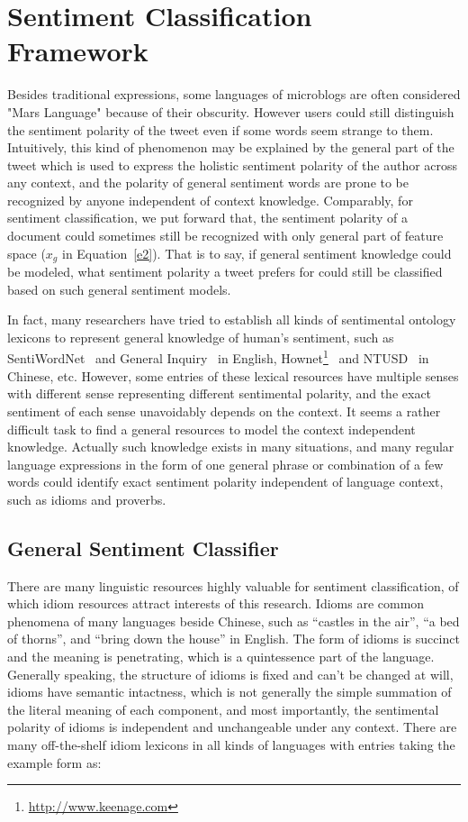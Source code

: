 \documentclass{llncs}
\begin{document}
\section{Sentiment Classification Framework}
\label{framework}
Besides traditional expressions, some languages of microblogs are often considered "Mars Language" because of their obscurity.  
However users could still distinguish the sentiment polarity of the tweet even if some words seem strange to them.
Intuitively, this kind of phenomenon may be explained by the general part of the tweet which is used to express the holistic sentiment polarity of the author across any context, and the polarity of general sentiment words are prone to be recognized by anyone independent of context knowledge. 
Comparably, for sentiment classification, we put forward that, the sentiment polarity of a document could sometimes still be recognized with only general part of feature space ($ x_{g} $ in Equation~\ref{e2}). 
That is to say, if general sentiment knowledge could be modeled, what sentiment polarity a tweet prefers for could still be classified based on such general sentiment models. 

In fact, many researchers have tried to establish all kinds of sentimental ontology lexicons to represent general knowledge of human’s sentiment, such as SentiWordNet~\cite{xsongx:b17} and General Inquiry~\cite{xsongx:b18} in English, Hownet\footnote{\url{http://www.keenage.com}}~\cite{xsongx:b19} and NTUSD~\cite{xsongx:b20} in Chinese, etc. 
However, some entries of these lexical resources have multiple senses with different sense representing different sentimental polarity, and the exact sentiment of each sense unavoidably depends on the context.
It seems a rather difficult task to find a general resources to model the context independent knowledge.
Actually such knowledge exists in many situations, and many regular language expressions in the form of one general phrase or combination of a few words could identify exact sentiment polarity independent of language context, such as idioms and proverbs. 
\subsection{General Sentiment Classifier}
\label{general}
There are many linguistic resources highly valuable for sentiment classification, of which idiom resources attract interests of this research. 
Idioms are common phenomena of many languages beside Chinese, such as ``castles in the air'', ``a bed of thorns'', and ``bring down the house'' in English.
The form of idioms is succinct and the meaning is penetrating, which is a quintessence part of the language. 
Generally speaking, the structure of idioms is fixed and can’t be changed at will, idioms have semantic intactness, which is not generally the simple summation of the literal meaning of each component, and most importantly, the sentimental polarity of idioms is independent and unchangeable under any context. 
There are many off-the-shelf idiom lexicons in all kinds of languages with entries taking the example form as:
\end{document}
